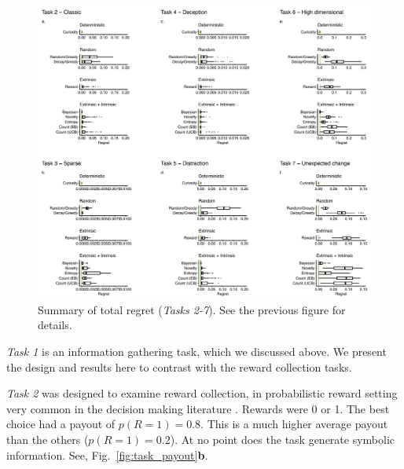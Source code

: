 \begin{figure}
    \label{fig:supp_regret} 
	\includegraphics[width=11.4cm]{img/supp_regret.pdf} 
	\caption{Summary of total regret (\textit{Tasks 2-7}). See the previous figure for details.}
\end{figure}


\textit{Task 1} is an information gathering task, which we discussed above.  We present the design and results here to contrast with the reward collection tasks. 

\textit{Task 2} was designed to examine reward collection, in probabilistic reward setting very common in the decision making literature \cite{schonberg2007reinforcement,frank2004carrot,cavanagh2014conflict,jahfari2019cross,collins2014opponent,collins2017interactions,glascher2010states}. Rewards were 0 or 1. The best choice had a payout of $p(R=1) = 0.8$. This is a much higher average payout than the others ($p(R=1) = 0.2$). At no point does the task generate symbolic information. See, Fig.~\ref{fig:task_payout}\textbf{b}. 

